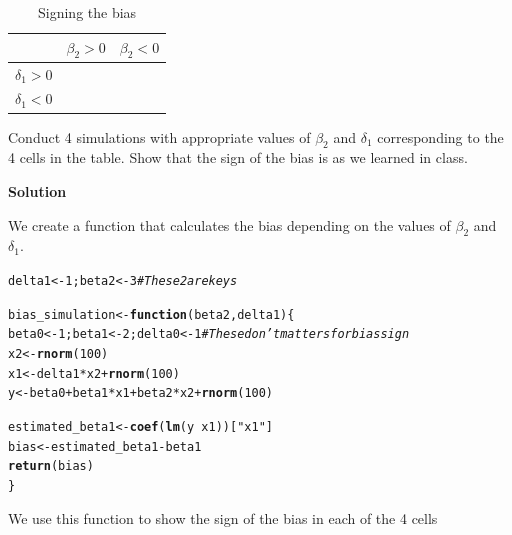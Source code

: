 \documentclass{article}\usepackage[]{graphicx}\usepackage[]{color}
\makeatletter
\newcommand{\hlnum}[1]{\textcolor[rgb]{0.686,0.059,0.569}{#1}}%
\newcommand{\hlstr}[1]{\textcolor[rgb]{0.192,0.494,0.8}{#1}}%
\newcommand{\hlcom}[1]{\textcolor[rgb]{0.678,0.584,0.686}{\textit{#1}}}%
\newcommand{\hlopt}[1]{\textcolor[rgb]{0,0,0}{#1}}%
\newcommand{\hlstd}[1]{\textcolor[rgb]{0.345,0.345,0.345}{#1}}%
\newcommand{\hlkwa}[1]{\textcolor[rgb]{0.161,0.373,0.58}{\textbf{#1}}}%
\newcommand{\hlkwb}[1]{\textcolor[rgb]{0.69,0.353,0.396}{#1}}%
\newcommand{\hlkwc}[1]{\textcolor[rgb]{0.333,0.667,0.333}{#1}}%
\newcommand{\hlkwd}[1]{\textcolor[rgb]{0.737,0.353,0.396}{\textbf{#1}}}%
\newenvironment{kframe}{%
 \def\at@end@of@kframe{}%
 \ifinner\ifhmode%
  \def\at@end@of@kframe{\end{minipage}}%
  \begin{minipage}{\columnwidth}%
 \fi\fi%
 \def\FrameCommand##1{\hskip\@totalleftmargin \hskip-\fboxsep
 \colorbox{shadecolor}{##1}\hskip-\fboxsep
     \hskip-\linewidth \hskip-\@totalleftmargin \hskip\columnwidth}%
 \MakeFramed {\advance\hsize-\width
   \@totalleftmargin\z@ \linewidth\hsize
   \@setminipage}}%
 {\par\unskip\endMakeFramed%
 \at@end@of@kframe}
\newenvironment{knitrout}{}{} %
\makeatother
\begin{document}
\begin{table}[]
\centering
\caption{Signing the bias}
\label{my-label}
\begin{tabular}{|l|l|l|}
\hline
               & $\beta_2 > 0$ & $\beta_2 < 0$ \\ \hline
$\delta_1 > 0$ &               &               \\ \hline
$\delta_1 < 0$ &               &               \\ \hline
\end{tabular}
\end{table}

Conduct 4 simulations with appropriate values of $\beta_2$ and $\delta_1$ corresponding to the 4 cells in the table. Show that the sign of the bias is as we learned in class.

\textbf{Solution}

We create a function that calculates the bias depending on the values of $\beta_2$ and $\delta_1$.
\begin{knitrout}
\color{fgcolor}\begin{kframe}
\begin{alltt}
\hlstd{delta1} \hlkwb{<-} \hlnum{1} \hlstd{; beta2} \hlkwb{<-} \hlnum{3} \hlcom{# These 2 are keys}

\hlstd{bias_simulation} \hlkwb{<-} \hlkwa{function}\hlstd{(}\hlkwc{beta2}\hlstd{,} \hlkwc{delta1}\hlstd{) \{}
  \hlstd{beta0} \hlkwb{<-} \hlnum{1} \hlstd{; beta1} \hlkwb{<-} \hlnum{2} \hlstd{; delta0} \hlkwb{<-} \hlnum{1} \hlcom{# These don't matters for bias sign}
  \hlstd{x2} \hlkwb{<-} \hlkwd{rnorm}\hlstd{(}\hlnum{100}\hlstd{)}
  \hlstd{x1} \hlkwb{<-} \hlstd{delta1} \hlopt{*} \hlstd{x2} \hlopt{+} \hlkwd{rnorm}\hlstd{(}\hlnum{100}\hlstd{)}
  \hlstd{y} \hlkwb{<-} \hlstd{beta0} \hlopt{+} \hlstd{beta1} \hlopt{*} \hlstd{x1} \hlopt{+} \hlstd{beta2} \hlopt{*} \hlstd{x2} \hlopt{+} \hlkwd{rnorm}\hlstd{(}\hlnum{100}\hlstd{)}

  \hlstd{estimated_beta1} \hlkwb{<-} \hlkwd{coef}\hlstd{(}\hlkwd{lm}\hlstd{(y} \hlopt{~} \hlstd{x1))[}\hlstr{"x1"}\hlstd{]}
  \hlstd{bias} \hlkwb{<-} \hlstd{estimated_beta1} \hlopt{-} \hlstd{beta1}
  \hlkwd{return}\hlstd{(bias)}
\hlstd{\}}
\end{alltt}
\end{kframe}
\end{knitrout}

We use this function to show the sign of the bias in each of the 4 cells
\end{document}
